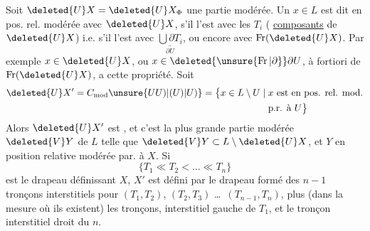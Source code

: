 
 Soit $\deleted{U}X=\deleted{U}X_{\Phi}$ une partie modérée. Un $x\in L$ est dit en pos. rel. modérée avec $\deleted{U}X$, s'il l'est avec les $T_i$ ( \uline{composants} de $\deleted{U}X$) i.e. s'il l'est avec $\underset{\partial U}{\underline{\bigcup\partial T_i}}$, ou encore avec $\operatorname{Fr}(\deleted{U}X)$.
Par exemple  $x\in\deleted{U}X$, ou $x\in\deleted{\unsure{\operatorname{Fr}|\partial}}\partial U$, à fortiori de $\operatorname{Fr}(\deleted{U}X)$, a cette propriété. Soit
\[
\begin{aligned}
\deleted{U}X'=C_{\mathrm{mod}}\unsure{U U)|(U)|U)}=\bigl\{x\in L\setminus U\mid{}&x\text{ est en pos. rel. mod.}\\
&\text{p.r. à }U\bigr\}
\end{aligned}
\]
Alors  $\deleted{U}X'$ est , et c'est la plus grande partie modérée $\deleted{V}Y$ de $L$ telle que $\deleted{V}Y\subset L\setminus\deleted{U}X$, et $Y$ en position relative modérée par. à $X$. Si
\[
\{T_1\ll T_2<\ldots\ll T_n\}
\]
est le drapeau définissant  $X$, $X'$ est défini par le drapeau formé des $n-1$ tronçons interstitiels  pour $(T_1,T_2)$, $(T_2,T_3)$ \ldots\ $(T_{n-1},T_n)$, plus (dans la mesure où ils existent) les tronçons, interstitiel gauche de $T_1$, et le tronçon interstitiel droit du $n$. 
